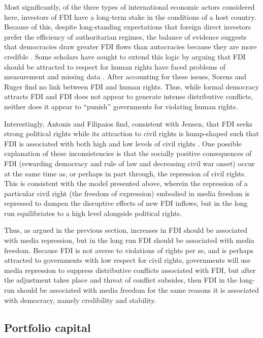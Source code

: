 \documentclass[a4paper]{article}\usepackage[]{graphicx}\usepackage[]{color}
\begin{document}
Most significantly, of the three types of international economic actors considered here, investors of FDI have a long-term stake in the conditions of a host country. Because of this, despite long-standing expectations that foreign direct investors prefer the efficiency of authoritarian regimes, the balance of evidence suggests that democracies draw greater FDI flows than autocracies because they are more credible \parencite{Jensen:2003to}. Some scholars have sought to extend this logic by arguing that FDI should be attracted to respect for human rights \parencite{Blanton:2007gu} have faced problems of measurement and missing data \parencite{Sorens:2012hc}. After accounting for these issues, Sorens and Ruger find no link between FDI and human rights. Thus, while formal democracy attracts FDI and FDI does not appear to generate intense distributive conflicts, neither does it appear to “punish” governments for violating human rights.

Interestingly, Antonis and Filipaios find, consistent with Jensen, that FDI seeks strong political rights while its attraction to civil rights is hump-shaped such that FDI is associated with both high and low levels of civil rights \parencite*{Adam:2007gn}. One possible explanation of these inconsistencies is that the socially positive consequences of FDI (rewarding democracy and rule of law and decreasing civil war onset) occur at the same time as, or perhaps in part through, the repression of civil rights. This is consistent with the model presented above, wherein the repression of a particular civil right (the freedom of expression) embodied in media freedom is repressed to dampen the disruptive effects of new FDI inflows, but in the long run equilibriates to a high level alongside political rights.

Thus, as argued in the previous section, increases in FDI should be associated with media repression, but in the long run FDI should be associated with media freedom. Because FDI is not averse to violations of rights per se, and is perhaps attracted to governments with low respect for civil rights, governments will use media repression to suppress distributive conflicts associated with FDI, but after the adjustment takes place and threat of conflict subsides, then FDI in the long-run should be associated with media freedom for the same reasons it is associated with democracy, namely credibility and stability.

\subsection{Portfolio capital}
\end{document}
